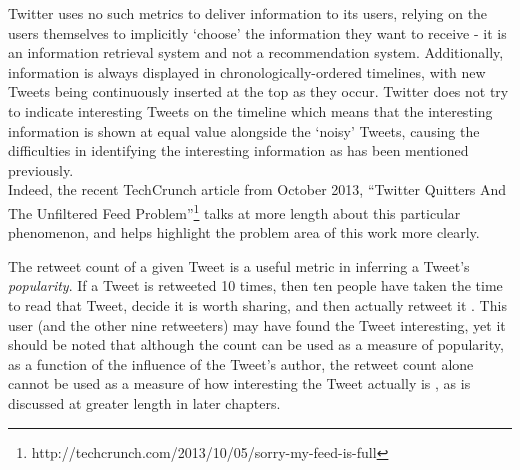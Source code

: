 Twitter uses no such metrics to deliver information to its users, relying on the users themselves to implicitly `choose' the information they want to receive - it is an information retrieval system and not a recommendation system. Additionally, information is always displayed in chronologically-ordered timelines, with new Tweets being continuously inserted at the top as they occur. Twitter does not try to indicate interesting Tweets on the timeline which means that the interesting information is shown at equal value alongside the `noisy' Tweets, causing the difficulties in identifying the interesting information as has been mentioned previously.\\
Indeed, the recent TechCrunch article from October 2013, ``Twitter Quitters And The Unfiltered Feed Problem''\footnote{http://techcrunch.com/2013/10/05/sorry-my-feed-is-full} talks at more length about this particular phenomenon, and helps highlight the problem area of this work more clearly.

The retweet count of a given Tweet is a useful metric in inferring a Tweet's \textit{popularity}. If a Tweet is retweeted 10 times, then ten people have taken the time to read that Tweet, decide it is worth sharing, and then actually retweet it \cite{uysal11}. This user (and the other nine retweeters) may have found the Tweet interesting, yet it should be noted that although the count can be used as a measure of popularity, as a function of the influence of the Tweet's author, the retweet count alone cannot be used as a measure of how interesting the Tweet actually is \cite{naveed11}, as is discussed at greater length in later chapters.

